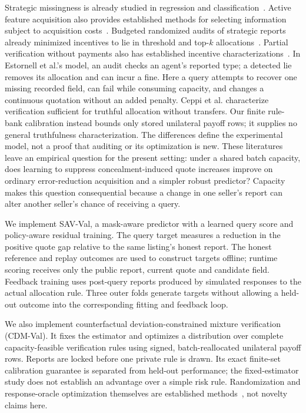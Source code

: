 Strategic missingness is already studied in regression and
classification~\cite{zhang2020strategic,krishnaswamy2021withheld}. Active
feature acquisition also provides established methods for selecting
information subject to acquisition costs~\cite{janisch2019costly,
shim2018joint,li2021gsm,valancius2024aco}.
Budgeted randomized audits of strategic reports already minimized incentives
to lie in threshold and top-$k$ allocations~\cite{estornell2021audits}.
Partial verification without payments also has established incentive
characterizations~\cite{ceppi2019verification}.
In Estornell et al.'s model, an audit checks an agent's reported type;
a detected lie removes its allocation and can incur a fine. Here a query
attempts to recover one missing recorded field, can fail while consuming
capacity, and changes a continuous quotation without an added penalty.
Ceppi et al. characterize verification sufficient for truthful allocation
without transfers. Our finite rule-bank calibration instead bounds only
stored unilateral payoff rows; it supplies no general truthfulness
characterization. The differences define the experimental model, not a
proof that auditing or its optimization is new.
These literatures leave an
empirical question for the present setting: under a shared batch capacity,
does learning to suppress concealment-induced quote increases improve on
ordinary error-reduction acquisition and a simpler robust predictor?
Capacity makes this question consequential because a change in one
seller's report can alter another seller's chance of receiving a query.

We implement SAV-Val, a mask-aware predictor with a learned query score
and policy-aware residual training. The query target measures a reduction
in the positive quote gap relative to the same listing's honest report.
The honest reference and replay outcomes are used to construct targets
offline; runtime scoring receives only the public report, current quote
and candidate field. Feedback training uses post-query reports produced
by simulated responses to the actual allocation rule. Three outer folds
generate targets without allowing a held-out outcome into the
corresponding fitting and feedback loop.

We also implement counterfactual deviation-constrained mixture verification
(CDM-Val). It fixes the estimator and optimizes a distribution over complete
capacity-feasible verification rules using signed, batch-reallocated
unilateral payoff rows. Reports are locked before one private rule is drawn.
Its exact finite-set calibration guarantee is separated from held-out
performance; the fixed-estimator study does not establish an advantage over a
simple risk rule. Randomization and response-oracle optimization themselves
are established methods~\cite{jain2011doubleoracle}, not novelty claims here.

